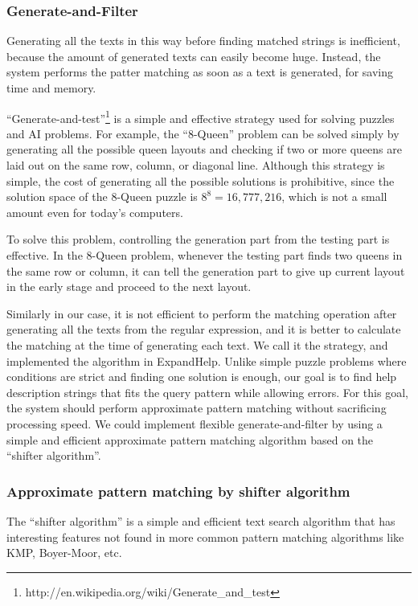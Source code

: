 \documentclass{sigchi}
\def\EH{\textsf{ExpandHelp}}
\begin{document}
\subsubsection{Generate-and-Filter}

Generating all the texts in this way before finding matched strings is
inefficient, because the amount of generated texts can easily become huge.
Instead, the system performs the patter matching as soon as a text is generated,
for saving time and memory.

``Generate-and-test''\footnote{
  {\sf http:{\slash}{\slash}en.wikipedia.org{\slash}wiki{\slash}Generate\_and\_test}
}
is a simple and effective strategy
used for solving puzzles and AI problems.
For example,
the ``8-Queen'' problem can be solved simply by
generating all the possible queen layouts and checking if
two or more queens are laid out on the same row, column, or diagonal line.
Although this strategy is simple, the cost of
generating all the possible solutions is prohibitive, since
the solution space of the 8-Queen puzzle is $8^8 = 16,777,216$,
which is not a small amount even for today's computers.

To solve this problem,
controlling the generation part from the testing part is effective.
In the 8-Queen problem,
whenever the testing part finds two queens in the same row or column,
it can tell the generation part to
give up current layout in the early stage and proceed to the next layout.

Similarly in our case,
it is not efficient to perform the matching operation
after generating all the texts from the regular expression,
and it is better to calculate the matching
at the time of generating each text.
We call it the  strategy,
and implemented the algorithm in {\EH}.
Unlike simple puzzle problems where
conditions are strict and finding one solution is enough,
our goal is to find help description strings
that fits the query pattern while allowing errors.
For this goal,
the system should perform approximate pattern matching
without sacrificing processing speed.
%
We could implement flexible generate-and-filter by using a simple and efficient
approximate pattern matching algorithm based on the ``shifter algorithm''.

\subsubsection{Approximate pattern matching by shifter algorithm}

The ``shifter algorithm''\cite{Wu:1992:FTS:135239.135244}
is a simple and efficient
text search algorithm that has interesting features
not found in more common pattern matching algorithms like
KMP\cite{KMP}, Boyer-Moor\cite{Boyer:1977:FSS:359842.359859}, etc.
\end{document}
